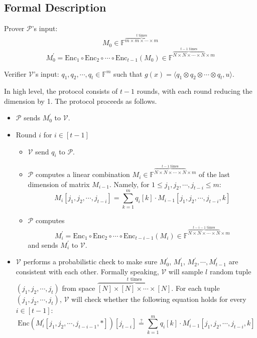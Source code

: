 \subsection{Formal Description}

Prover $\mathcal{P}$'s input: 
$$
    M_0 \in \mathbb{F}^{\overbrace{m \times m \times \cdots \times m}^{t \text{ times}}}
$$
$$
    M_0^{\prime} = \text{Enc}_1 \circ \text{Enc}_2 \circ \cdots \circ \text{Enc}_{t-1}(M_0) \in \mathbb{F}^{\overbrace{N \times N \times \cdots \times N}^{t-1 \text{ times}} \times m}
$$

Verifier $\mathcal{V}$'s input: $q_1, q_2, \cdots, q_t \in \mathbb{F}^{m}$ such that $g(x) =\langle q_1 \otimes q_2 \otimes \cdots \otimes q_t, u \rangle$.

In high level, the protocol consists of $t-1$ rounds, with each round reducing the dimension by 1. The protocol proceeds as follows. 

\begin{itemize}
    \item $\mathcal{P}$ sends $M_0^{\prime}$ to $\mathcal{V}$.
    
    \item Round $i$ for $i \in [t-1]$
    
    \begin{itemize}
        \item $\mathcal{V}$ send $q_i$ to $\mathcal{P}$.
        \item $\mathcal{P}$ computes a linear combination 
        $M_i \in \mathbb{F}^{\overbrace{N \times N \times \cdots \times N}^{t-1 \text{ times}} \times m}$ of the last dimension of matrix $M_{i-1}$.
        Namely, for $1 \le j_1,j_2, \cdots, j_{t-i} \le m$:
$$
    M_i[j_1,j_2, \cdots, j_{t-i}] = \sum_{k=1}^{m} q_{i}[k] \cdot M_{i-1}[j_1,j_2, \cdots, j_{t-i}, k]
$$

        \item $\mathcal{P}$ computes 
$$
    M_i^\prime = \text{Enc}_1 \circ \text{Enc}_2 \circ \cdots \circ \text{Enc}_{t - i - 1}(M_i)\in \mathbb{F}^{\overbrace{N \times N \times \cdots \times N}^{t-i-1 \text{ times}} \times m}
$$    
        and sends $M_i^\prime$ to $\mathcal{V}$.
    \end{itemize}
    
    \item $\mathcal{V}$ performs a probabilistic check to make sure $M_0^\prime$, $M_1^\prime$, $M_2^\prime, \cdots, M_{t-1}^\prime$ are consistent with each other. Formally speaking, $\mathcal{V}$ will sample $l$ random tuple $(j_1, j_2, \cdots, j_t)$ from space $\overbrace{[N] \times [N] \times \cdots \times [N]}^{t \text{ times}}$. 
    For each tuple $(j_1, j_2, \cdots, j_t)$, 
    $\mathcal{V}$ will check whether the following equation holds for every $i \in [t-1]$:
$$
    \text{Enc}(M_i^\prime[j_1, j_2, \cdots, j_{t-i-1}, *])[j_{t-i}] \stackrel{?}{=} \sum_{k=1}^m q_i[k] \cdot M_{i-1}^{\prime}[j_1,j_2, \cdots, j_{t-i},k]
$$
\end{itemize}

